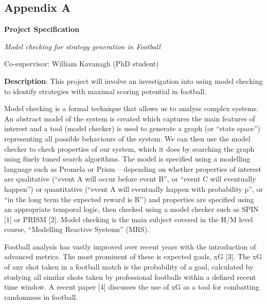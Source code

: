 \documentclass{l4proj}
\begin{document}
%
%

\begin{appendices}

\chapter{Appendix A}\label{appendix1}


\textbf{Project Specification}

\textit{Model checking for strategy generation in Football}

Co-supervisor: William Kavanagh (PhD student) 

\textbf{Description}:  
This project will involve an investigation into using model checking to identify strategies with maximal scoring potential in football.  

Model checking is a formal technique that allows us to analyse complex systems. An abstract model of the system is created which captures the main features of interest and a tool (model checker) is used to generate a graph (or “state space”) representing all possible behaviours of the system. We can then use the model checker to check properties of our system, which it does by searching the graph using finely tuned search algorithms.  The model is specified using a modelling language such as Promela or Prism – depending on whether properties of interest are qualitative (“event A will occur before event B”, or “event C will eventually happen”) or quantitative (“event A will eventually happen with probability p”, or “in the long term the expected reward is R”) and properties are specified using an appropriate temporal logic, then checked using a model checker such as SPIN [1] or PRISM [2]. Model checking is the main subject covered in the H/M level course, “Modelling Reactive Systems” (MRS). 

Football analysis has vastly improved over recent years with the introduction of advanced metrics. The most prominent of these is expected goals, xG [3]. The xG of any shot taken in a football match is the probability of a goal, calculated by studying all similar shots taken by professional footballs within a defined recent time window. A recent paper [4] discusses the use of xG as a tool for combatting randomness in football.  


\end{appendices}
\end{document}
